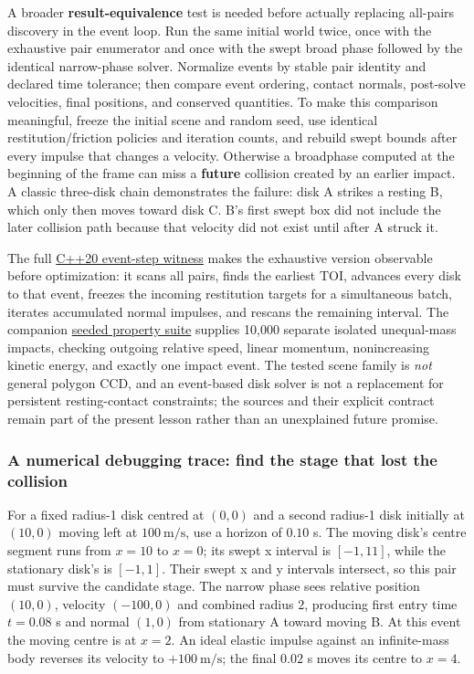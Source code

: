 A broader \textbf{result-equivalence} test is needed before actually replacing all-pairs discovery in the event loop. Run the same initial world twice, once with the exhaustive pair enumerator and once with the swept broad phase followed by the identical narrow-phase solver. Normalize events by stable pair identity and declared time tolerance; then compare event ordering, contact normals, post-solve velocities, final positions, and conserved quantities. To make this comparison meaningful, freeze the initial scene and random seed, use identical restitution/friction policies and iteration counts, and rebuild swept bounds after every impulse that changes a velocity. Otherwise a broadphase computed at the beginning of the frame can miss a \textbf{future} collision created by an earlier impact. A classic three-disk chain demonstrates the failure: disk A strikes a resting B, which only then moves toward disk C. B's first swept box did not include the later collision path because that velocity did not exist until after A struck it.

The full \hyperref[source-file-ad26f703e8f150d27a72bf93]{C++20 event-step witness} makes the exhaustive version observable before optimization: it scans all pairs, finds the earliest TOI, advances every disk to that event, freezes the incoming restitution targets for a simultaneous batch, iterates accumulated normal impulses, and rescans the remaining interval. The companion \hyperref[source-file-50214a688c0ef812f3094877]{seeded property suite} supplies 10,000 separate isolated unequal-mass impacts, checking outgoing relative speed, linear momentum, nonincreasing kinetic energy, and exactly one impact event. The tested scene family is \emph{not} general polygon CCD, and an event-based disk solver is not a replacement for persistent resting-contact constraints; the sources and their explicit contract remain part of the present lesson rather than an unexplained future promise.

\subsubsection{A numerical debugging trace: find the stage that lost the collision}\label{04-visual-computing-ii-ch026-a-numerical-debugging-trace-find-the-stage-that-lost-the-collision}

For a fixed radius-1 disk centred at \((0,0)\) and a second radius-1 disk initially at \((10,0)\) moving left at \(100\ \mathrm{m/s}\), use a horizon of \(0.10\) s. The moving disk's centre segment runs from \(x=10\) to \(x=0\); its swept x interval is \([-1,11]\), while the stationary disk's is \([-1,1]\). Their swept x and y intervals intersect, so this pair must survive the candidate stage. The narrow phase sees relative position \((10,0)\), velocity \((-100,0)\) and combined radius \(2\), producing first entry time \(t=0.08\) s and normal \((1,0)\) from stationary A toward moving B. At this event the moving centre is at \(x=2\). An ideal elastic impulse against an infinite-mass body reverses its velocity to \(+100\ \mathrm{m/s}\); the final \(0.02\) s moves its centre to \(x=4\).

